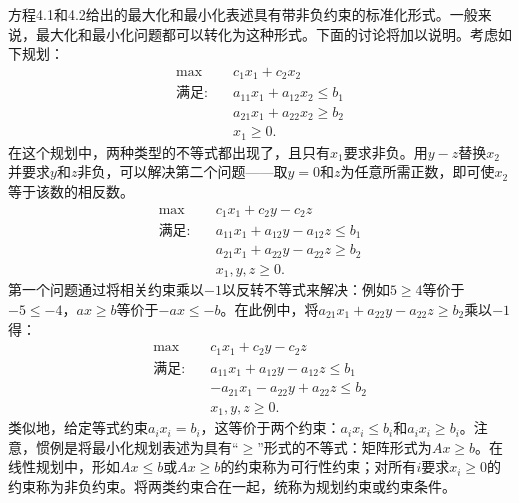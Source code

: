 \begin{translation}
方程4.1和4.2给出的最大化和最小化表述具有带非负约束的标准化形式。一般来说，最大化和最小化问题都可以转化为这种形式。下面的讨论将加以说明。考虑如下规划：
\[
\begin{aligned}
\max \quad & c_1 x_1 + c_2 x_2 \\
\text{满足:} \quad & a_{11}x_1 + a_{12}x_2 \le b_1 \\
& a_{21}x_1 + a_{22}x_2 \ge b_2 \\
& x_1 \ge 0.
\end{aligned}
\]
在这个规划中，两种类型的不等式都出现了，且只有$x_1$要求非负。用$y - z$替换$x_2$并要求$y$和$z$非负，可以解决第二个问题——取$y = 0$和$z$为任意所需正数，即可使$x_2$等于该数的相反数。
\[
\begin{aligned}
\max \quad & c_1 x_1 + c_2 y - c_2 z \\
\text{满足:} \quad & a_{11}x_1 + a_{12}y - a_{12}z \le b_1 \\
& a_{21}x_1 + a_{22}y - a_{22}z \ge b_2 \\
& x_1, y, z \ge 0.
\end{aligned}
\]
第一个问题通过将相关约束乘以$-1$以反转不等式来解决：例如$5 \ge 4$等价于$-5 \le -4$，$ax \ge b$等价于$-ax \le -b$。在此例中，将$a_{21}x_1 + a_{22}y - a_{22}z \ge b_2$乘以$-1$得：
\[
\begin{aligned}
\max \quad & c_1 x_1 + c_2 y - c_2 z \\
\text{满足:} \quad & a_{11}x_1 + a_{12}y - a_{12}z \le b_1 \\
& -a_{21}x_1 - a_{22}y + a_{22}z \le b_2 \\
& x_1, y, z \ge 0.
\end{aligned}
\]
类似地，给定等式约束$a_i x_i = b_i$，这等价于两个约束：$a_i x_i \le b_i$和$a_i x_i \ge b_i$。注意，惯例是将最小化规划表述为具有``$\ge$''形式的不等式：矩阵形式为$Ax \ge b$。在线性规划中，形如$Ax \le b$或$Ax \ge b$的约束称为可行性约束；对所有$i$要求$x_i \ge 0$的约束称为非负约束。将两类约束合在一起，统称为规划约束或约束条件。
\end{translation}

